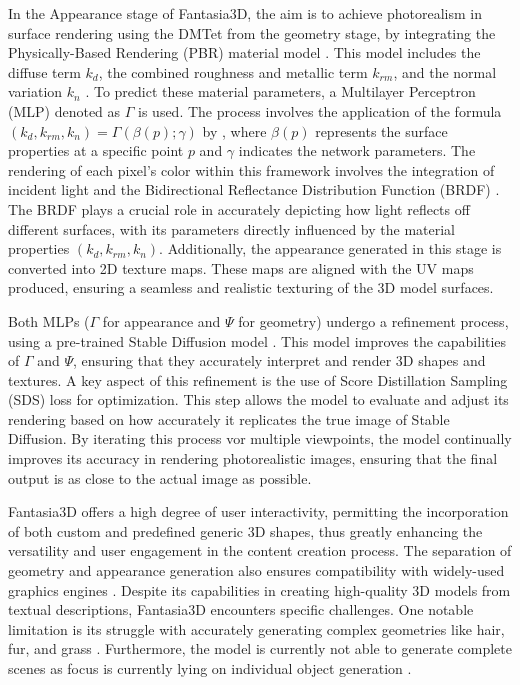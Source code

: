 In the Appearance stage of Fantasia3D, the aim is to achieve photorealism in surface rendering using the DMTet from the geometry stage, by integrating the Physically-Based Rendering (PBR) material model \citep{mcauley2012practical}. This model includes the diffuse term \( k_d \), the combined roughness and metallic term \( k_{rm} \), and the normal variation \( k_n \) \citep{chen2023fantasia3d}. To predict these material parameters, a Multilayer Perceptron (MLP) denoted as \( \Gamma \) is used. The process involves the application of the formula \((k_d, k_{rm}, k_n) = \Gamma(\beta(p); \gamma)\) by \citeauthor{chen2023fantasia3d}, where \( \beta(p) \) represents the surface properties at a specific point \( p \) and \( \gamma \) indicates the network parameters. The rendering of each pixel's color within this framework involves the integration of incident light and the Bidirectional Reflectance Distribution Function (BRDF) \citep{chen2023fantasia3d}. The BRDF plays a crucial role in accurately depicting how light reflects off different surfaces, with its parameters directly influenced by the material properties \( (k_d, k_{rm}, k_n) \). Additionally, the appearance generated in this stage is converted into 2D texture maps. These maps are aligned with the UV maps produced, ensuring a seamless and realistic texturing of the 3D model surfaces.

Both MLPs (\(\Gamma\) for appearance and \(\Psi\) for geometry) undergo a refinement process, using a pre-trained Stable Diffusion model \citep{rombachStableDiffusion}. This model improves the capabilities of \(\Gamma\) and \(\Psi\), ensuring that they accurately interpret and render 3D shapes and textures. A key aspect of this refinement is the use of Score Distillation Sampling (SDS) loss \citep{mildenhallNERF} for optimization. This step allows the model to evaluate and adjust its rendering based on how accurately it replicates the true image of Stable Diffusion. By iterating this process vor multiple viewpoints, the model continually improves its accuracy in rendering photorealistic images, ensuring that the final output is as close to the actual image as possible.

Fantasia3D offers a high degree of user interactivity, permitting the incorporation of both custom and predefined generic 3D shapes, thus greatly enhancing the versatility and user engagement in the content creation process. The separation of geometry and appearance generation also ensures compatibility with widely-used graphics engines \citep{chen2023fantasia3d}. Despite its capabilities in creating high-quality 3D models from textual descriptions, Fantasia3D encounters specific challenges. One notable limitation is its struggle with accurately generating complex geometries like hair, fur, and grass \citep{chen2023fantasia3d}. Furthermore, the model is currently not able to generate complete scenes as focus is currently lying on individual object generation \citep{chen2023fantasia3d}.